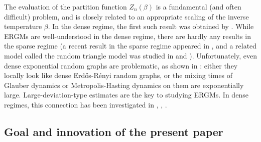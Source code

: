 \documentclass[bj,authoryear,noshowframe]{imsart}
\numberwithin{equation}{section}
\theoremstyle{plain}
\theoremstyle{definition}
\newcommand{\out}[1]{}
\begin{document}
The evaluation of the partition function $Z_n(\beta)$ is a fundamental (and often difficult) problem, and is closely related to an appropriate scaling of the inverse temperature $\beta$. In the dense regime, the first such result was obtained by \out{Chatterjee and Diaconis}\cite{chatterjee2013estimating}. While ERGMs are well-understood in the dense regime, there are hardly any results in the sparse regime (a recent result in the sparse regime appeared in \out{Mukherjee}\cite{mukherjee2020degeneracy}, and a related model called the random triangle model was studied in \out{Jonasson}\cite{jonasson1999random} and \out{H{\"a}ggstr{\"o}m and Jonasson}\cite{haggstrom1999phase}). Unfortunately, even dense exponential random graphs are problematic, as shown in \out{Bhamidi, Bresler and Sly}\cite{BhaBreSly11}: either they locally look like dense Erd\H{o}s-R\'{e}nyi random graphs, or the mixing times of Glauber dynamics or Metropolis-Hasting dynamics on them are exponentially large. Large-deviation-type estimates are the key to studying ERGMs. In dense regimes, this connection has been investigated in \out{Chatterjee and Diaconis}\cite{chatterjee2013estimating}, \out{Chatterjee and Dembo}\cite{chatterjee2016nonlinear}, \out{Bhamidi, Chakraborty, Cranmer and Desmarais}\cite{bhamidi2018weighted}.


\subsection{Goal and innovation of the present paper} 
\end{document}
